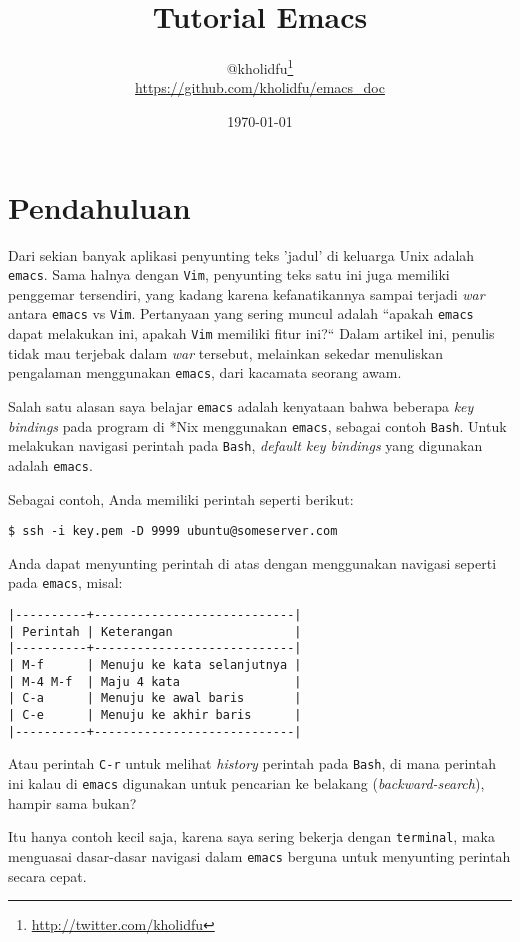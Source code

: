 \documentclass{article}
\title{Tutorial Emacs}
\author{
  @kholidfu\footnote{\url{http://twitter.com/kholidfu}}\\
  \footnotesize{\url{https://github.com/kholidfu/emacs\_doc}}
}
\date{\today}
\begin{document}
\maketitle
\tableofcontents
\pagebreak

\section{Pendahuluan}
Dari sekian banyak aplikasi penyunting teks 'jadul' di keluarga
Unix adalah \verb=emacs=. Sama halnya dengan \verb=Vim=, penyunting
teks satu ini juga memiliki penggemar tersendiri, yang kadang
karena kefanatikannya sampai terjadi \emph{war} antara \verb=emacs=
vs \verb=Vim=. Pertanyaan yang sering muncul adalah ``apakah
\verb=emacs= dapat melakukan ini, apakah \verb=Vim= memiliki fitur
ini?`` Dalam artikel ini, penulis tidak mau terjebak dalam 
\emph{war} tersebut, melainkan sekedar menuliskan pengalaman 
menggunakan \verb=emacs=, dari kacamata seorang awam.

Salah satu alasan saya belajar \verb=emacs= adalah kenyataan
bahwa beberapa \emph{key bindings} pada program di *Nix 
menggunakan \verb=emacs=, sebagai contoh \verb=Bash=. Untuk
melakukan navigasi perintah pada \verb=Bash=, 
\emph{default key bindings} yang digunakan adalah \verb=emacs=.

Sebagai contoh, Anda memiliki perintah seperti berikut:

\begin{verbatim}
$ ssh -i key.pem -D 9999 ubuntu@someserver.com
\end{verbatim}

Anda dapat menyunting perintah di atas dengan menggunakan
navigasi seperti pada \verb=emacs=, misal:

\begin{verbatim}
|----------+----------------------------|
| Perintah | Keterangan                 |
|----------+----------------------------|
| M-f      | Menuju ke kata selanjutnya |
| M-4 M-f  | Maju 4 kata                |
| C-a      | Menuju ke awal baris       |
| C-e      | Menuju ke akhir baris      |
|----------+----------------------------|
\end{verbatim}

Atau perintah \verb=C-r= untuk melihat \emph{history} perintah
pada \verb=Bash=, di mana perintah ini kalau di \verb=emacs=
digunakan untuk pencarian ke belakang (\emph{backward-search}),
hampir sama bukan?

Itu hanya contoh kecil saja, karena saya sering bekerja dengan
\verb=terminal=, maka menguasai dasar-dasar navigasi dalam
\verb=emacs= berguna untuk menyunting perintah secara cepat.
\end{document}
